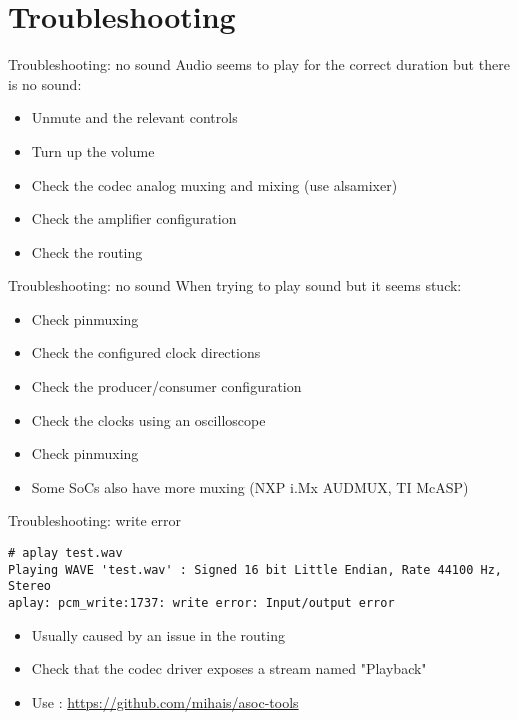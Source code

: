 \section{Troubleshooting}

\begin{frame}{Troubleshooting: no sound}
  Audio seems to play for the correct duration but there is no sound:
  \begin{itemize}
  \item Unmute  and the relevant controls
  \item Turn up the volume
  \item Check the codec analog muxing and mixing (use alsamixer)
  \item Check the amplifier configuration
  \item Check the routing
  \end{itemize}
\end{frame}

\begin{frame}{Troubleshooting: no sound}
  When trying to play sound but it seems stuck:
  \begin{itemize}
  \item Check pinmuxing
  \item Check the configured clock directions
  \item Check the producer/consumer configuration
  \item Check the clocks using an oscilloscope
  \item Check pinmuxing
  \item Some SoCs also have more muxing (NXP i.Mx AUDMUX, TI McASP)
  \end{itemize}
\end{frame}

\begin{frame}[fragile]{Troubleshooting: write error}
  \begin{block}{}
    \fontsize{10}{10}\selectfont
    \begin{verbatim}
# aplay test.wav
Playing WAVE 'test.wav' : Signed 16 bit Little Endian, Rate 44100 Hz, Stereo
aplay: pcm_write:1737: write error: Input/output error
    \end{verbatim}
  \end{block}
  \begin{itemize}
  \item Usually caused by an issue in the routing
  \item Check that the codec driver exposes a stream named "Playback"
  \item Use :
    \url{https://github.com/mihais/asoc-tools}
  \end{itemize}
\end{frame}

